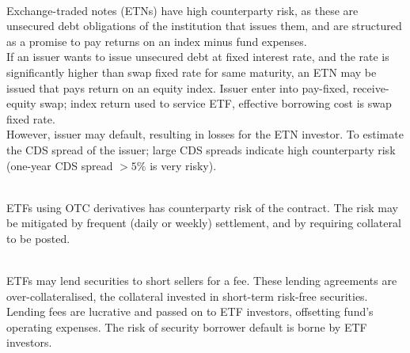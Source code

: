 \begin{remark} \\
Exchange-traded notes (ETNs) have high counterparty risk, as these are unsecured debt obligations of the institution that issues them, and are structured as a promise to pay  returns on an index minus fund expenses.\\
If an issuer wants to issue unsecured debt at fixed interest rate, and the rate is significantly higher than swap fixed rate for same maturity, an ETN may be issued that pays return on an equity index. Issuer enter into pay-fixed, receive-equity swap; index return used to service ETF, effective borrowing cost is swap fixed rate.\\
However, issuer may default, resulting in losses for the ETN investor. To estimate the CDS spread of the issuer; large CDS spreads indicate high counterparty risk (one-year CDS spread $> 5\%$ is very risky).
\end{remark}

\begin{remark} \\
ETFs using OTC derivatives has counterparty risk of the contract. The risk may be mitigated by frequent (daily or weekly) settlement, and by requiring collateral to be posted.
\end{remark}

\begin{remark} \\
ETFs may lend securities to short sellers for a fee. These lending agreements are over-collateralised, the collateral invested in short-term risk-free securities. Lending fees are lucrative and passed on to ETF investors, offsetting fund's operating expenses. The risk of security borrower default is borne by ETF investors.
\end{remark}

